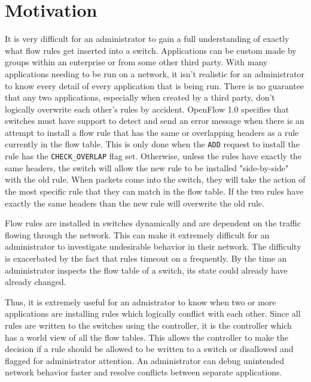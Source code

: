 \section{Motivation}
\label{sec:motivation}

It is very difficult for an administrator to gain a full understanding of exactly what flow rules get inserted into a switch. 
Applications can be custom made by groups within an enterprise or from some other third party.
With many applications needing to be run on a network, it isn't realistic for an administrator to know every detail of every application that is being run.
There is no guarantee that any two applications, especially when created by a third party, don't logically overwrite each other's rules by accident.
OpenFlow 1.0 specifies that switches must have support to detect and send an error message when there is an attempt to install a flow rule that has the same or overlapping headers as a rule currently in the flow table.
This is only done when the \texttt{ADD} request to install the rule has the \texttt{CHECK\_OVERLAP} flag set.
Otherwise, unless the rules have exactly the same headers, the switch will allow the new rule to be installed "side-by-side" with the old rule.
When packets come into the switch, they will take the action of the most specific rule that they can match in the flow table.
If the two rules have exactly the same headers than the new rule will overwrite the old rule.

Flow rules are installed in switches dynamically and are dependent on the traffic flowing through the network.
This can make it extremely difficult for an administrator to investigate undesirable behavior in their network.
The difficulty is exacerbated by the fact that rules timeout on a frequently.
By the time an administrator inspects the flow table of a switch, its state could already have already changed.

Thus, it is extremely useful for an admistrator to know when two or more applications are installing rules which logically conflict with each other.
Since all rules are written to the switches using the controller, it is the controller which has a world view of all the flow tables.
This allows the controller to make the decision if a rule should be allowed to be written to a switch or disallowed and flagged for administrator attention.
An administrator can debug unintended network behavior faster and resolve conflicts between separate applications.

